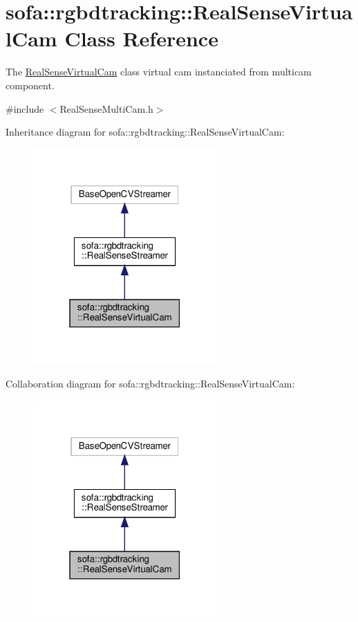 \hypertarget{classsofa_1_1rgbdtracking_1_1_real_sense_virtual_cam}{}\section{sofa\+:\+:rgbdtracking\+:\+:Real\+Sense\+Virtual\+Cam Class Reference}
\label{classsofa_1_1rgbdtracking_1_1_real_sense_virtual_cam}


The \hyperlink{classsofa_1_1rgbdtracking_1_1_real_sense_virtual_cam}{Real\+Sense\+Virtual\+Cam} class virtual cam instanciated from multicam component.  




{\ttfamily \#include $<$Real\+Sense\+Multi\+Cam.\+h$>$}



Inheritance diagram for sofa\+:\+:rgbdtracking\+:\+:Real\+Sense\+Virtual\+Cam\+:
\nopagebreak
\begin{figure}[H]
\begin{center}
\leavevmode
\includegraphics[width=199pt]{classsofa_1_1rgbdtracking_1_1_real_sense_virtual_cam__inherit__graph}
\end{center}
\end{figure}


Collaboration diagram for sofa\+:\+:rgbdtracking\+:\+:Real\+Sense\+Virtual\+Cam\+:
\nopagebreak
\begin{figure}[H]
\begin{center}
\leavevmode
\includegraphics[width=199pt]{classsofa_1_1rgbdtracking_1_1_real_sense_virtual_cam__coll__graph}
\end{center}
\end{figure}
